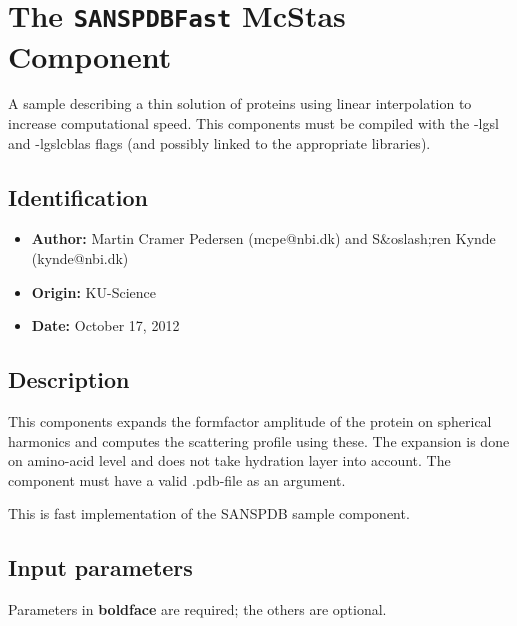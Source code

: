 \section{The \texttt{SANSPDBFast} McStas Component}
A sample describing a thin solution of proteins using linear interpolation
to increase computational speed. This components must be compiled with the
-lgsl and -lgslcblas flags (and possibly linked to the appropriate libraries).

\subsection*{Identification}
\begin{itemize}
  \item \textbf{Author:} Martin Cramer Pedersen (mcpe@nbi.dk) and S\&oslash;ren Kynde (kynde@nbi.dk)
  \item \textbf{Origin:} KU-Science
  \item \textbf{Date:} October 17, 2012
\end{itemize}

\subsection*{Description}
This components expands the formfactor amplitude of the protein on spherical harmonics and computes the scattering profile using these. The expansion is done on amino-acid level and does not take hydration layer into account. The component must have a valid .pdb-file as an argument.

This is fast implementation of the SANSPDB sample component.

\subsection*{Input parameters}
Parameters in \textbf{boldface} are required; the others are optional.

